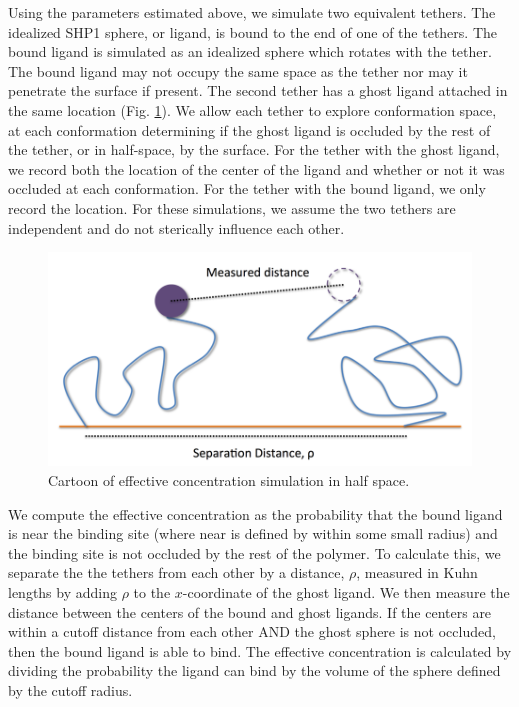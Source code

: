 \documentclass[../../AdvancementSummary.tex]{subfiles}
\begin{document}
Using the parameters estimated above, we simulate two equivalent tethers. The idealized SHP1 sphere, or ligand, is bound to the end of one of the tethers. The bound ligand is simulated as an idealized sphere which rotates with the tether. The bound ligand may not occupy the same space as the tether nor may it penetrate the surface if present. The second tether has a ghost ligand attached in the same location (Fig. \ref{fig: LocalConcCartoon}). We allow each tether to explore conformation space, at each conformation determining if the ghost ligand is occluded by the rest of the tether, or in half-space, by the surface. For the tether with the ghost ligand, we record both the location of the center of the ligand and whether or not it was occluded at each conformation. For the tether with the bound ligand, we only record the location. For these simulations, we assume the two tethers are independent and do not sterically influence each other.

\begin{figure}
\includegraphics[width=\linewidth]{Diagram.png}
\caption{Cartoon of effective concentration simulation in half space. \label{fig: LocalConcCartoon}}
\end{figure}

We compute the effective concentration as the probability that the bound ligand is near the binding site (where near is defined by within some small radius) and the binding site is not occluded by the rest of the polymer. To calculate this, we separate the the tethers from each other by a distance, $\rho$, measured in Kuhn lengths by adding $\rho$ to the $x$-coordinate of the ghost ligand. We then measure the distance between the centers of the bound and ghost ligands. If the centers are within a cutoff distance from each other AND the ghost sphere is not occluded, then the bound ligand is able to bind. The effective concentration is calculated by dividing the probability the ligand can bind by the volume of the sphere defined by the cutoff radius.
\end{document}
